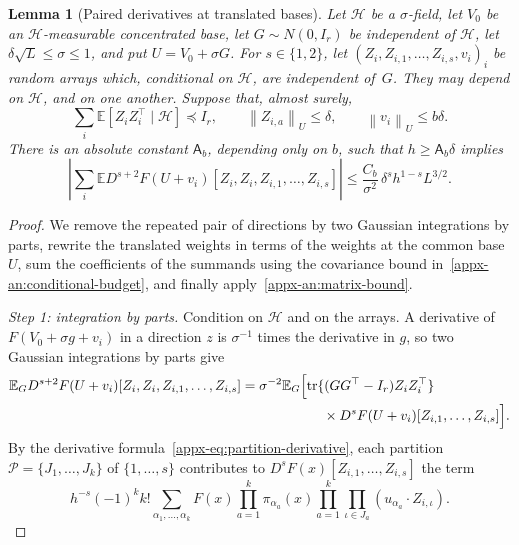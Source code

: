 \documentclass[11pt,letterpaper]{article}
\newif\ifshowrev
\newenvironment{revblock}{\ifshowrev\color{revblue}%
\hypersetup{linkcolor=revblue,citecolor=revblue,urlcolor=revblue}\fi}{}
\newif\ifshowtrim
\newcommand{\trim}[1]{\ifshowtrim{\color{revblue}%
\hypersetup{linkcolor=revblue,citecolor=revblue,urlcolor=revblue}#1}\else#1\fi}
\newcommand{\trs}[1]{\ifshowtrim{\color{revblue}#1}\else#1\fi}
\newtheorem{lemma}{Lemma}
\theoremstyle{remark}
\newcommand{\E}{\mathbb E}
\newcommand{\tr}{\operatorname{tr}}
\newcommand{\norm}[1]{\left\lVert#1\right\rVert}
\begin{document}
\begin{revblock}
\begin{lemma}[Paired derivatives at translated bases]
\label{appx-an:lem:restoration}
Let \(\mathcal H\) be a \(\sigma\)-field, let \(V_0\) be an
\(\mathcal H\)-measurable concentrated base, let \(G\sim N(0,I_r)\) be
independent of \(\mathcal H\), let \(\delta\sqrt L\le\sigma\le1\), and put
\(U=V_0+\sigma G\). For \(s\in\{1,2\}\), let
\((Z_i,Z_{i,1},\ldots,Z_{i,s},v_i)_i\) be random arrays which, conditional
on \(\mathcal H\), are independent of~\(G\). They may depend on
\(\mathcal H\), and on one another. Suppose that, almost surely,
\begin{equation}
 \sum_i\E[Z_iZ_i^\top\mid\mathcal H]\preceq I_r,
 \qquad \norm{Z_{i,a}}_U\le\delta,
 \qquad \norm{v_i}_U\le b\delta.
 \label{appx-an:conditional-budget}
\end{equation}
There is an absolute constant \(\mathsf A_b\), depending only on \(b\),
such that \(h\ge\mathsf A_b\delta\) implies
\begin{equation}
 \left|\sum_i\E D^{s+2}F(U+v_i)
         [Z_i,Z_i,Z_{i,1},\ldots,Z_{i,s}]\right|
 \le\frac{C_b}{\sigma^2}\,
                 \delta^s h^{1-s}L^{3/2}.
 \label{appx-an:restoration-bound}
\end{equation}
\end{lemma}

\begin{proof}
We remove the repeated pair of directions by two Gaussian integrations
by parts, rewrite the translated weights in terms of the weights at the
common base \(U\), sum the coefficients of the summands \trim{using the
covariance bound in}~\trs{\eqref{appx-an:conditional-budget}},
and finally apply~\eqref{appx-an:matrix-bound}.

\emph{Step 1: integration by parts.} Condition on \(\mathcal H\) and on
the arrays. A derivative of \(F(V_0+\sigma g+v_i)\) in a direction \(z\)
is \(\sigma^{-1}\) times the derivative in \(g\), so two Gaussian
integrations by parts give
\[
 \begin{split}
 \E_G D^{s+2}F(U+v_i)[Z_i,Z_i,Z_{i,1},\ldots,Z_{i,s}]
 &=\sigma^{-2}\E_G\Bigl[
    \tr\{(GG^\top-I_r)Z_iZ_i^\top\}\\
 &\hspace{6em}\times D^sF(U+v_i)[Z_{i,1},\ldots,Z_{i,s}]\Bigr].
 \end{split}
\]
By the derivative formula~\eqref{appx-eq:partition-derivative}, each
partition \(\mathcal P=\{J_1,\ldots,J_k\}\) of \(\{1,\ldots,s\}\)
contributes to \(D^sF(x)[Z_{i,1},\ldots,Z_{i,s}]\) the term
\[
 h^{-s}(-1)^kk!\sum_{\alpha_1,\ldots,\alpha_k}
 F(x)\prod_{a=1}^k\pi_{\alpha_a}(x)
 \prod_{a=1}^k\prod_{\iota\in J_a}(u_{\alpha_a}\cdot Z_{i,\iota}).
\]


\end{proof}
\end{revblock}
\end{document}
